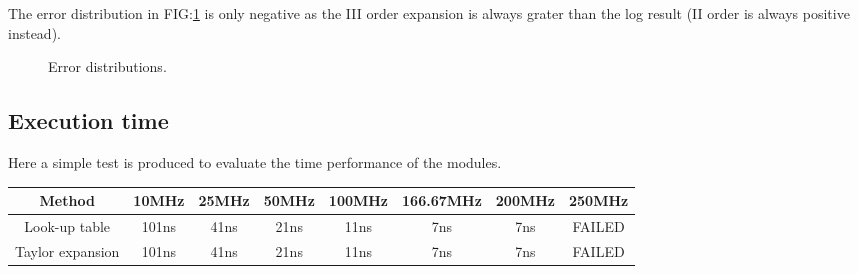 \documentclass[12pt]{article}
\begin{document}
The error distribution in FIG:\ref{fig:TE_Error} is only negative as the III order expansion is always grater than the log result (II order is always positive instead).
\begin{figure}[h]
    \begin{minipage}[c]{0.5\linewidth}
        \vspace{0pt}
        \centering
    \end{minipage}%
    \hfill%
    \begin{minipage}[c]{0.5\linewidth}
        \vspace{0pt}
        \centering
    \end{minipage}%
    \caption{Error distributions.}
    \label{fig:TE_Error}
\end{figure}

\subsection{Execution time}

Here a simple test is produced to evaluate the time performance of the modules.
\begin{table}[h]
\begin{tabular}{c||ccccccc} 
Method           & 10MHz  & 25MHz  & 50MHz & 100MHz & 166.67MHz & 200MHz & 250MHz\\ \hline
Look-up table    & 101ns & 41ns & 21ns & 11ns & 7ns & 7ns & FAILED\\
Taylor expansion & 101ns & 41ns & 21ns & 11ns & 7ns & 7ns & FAILED\\
\end{tabular}
\end{table}
\end{document}

